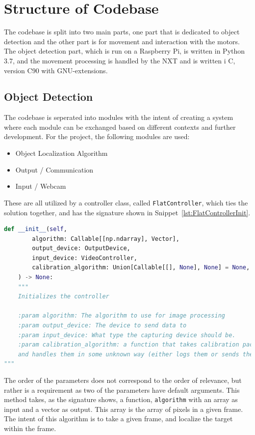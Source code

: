 \section{Structure of Codebase}
The codebase is split into two main parts, one part that is dedicated to object detection and the other part is for movement and interaction with the motors.
The object detection part, which is run on a Raspberry Pi, is written in Python 3{.}7, and the movement processing is handled by the NXT and is written i C, version C90 with GNU-extensions.


\subsection{Object Detection}
The codebase is seperated into modules with the intent of creating a system where each module can be exchanged based on different contexts and further development.
For the project, the following modules are used:
\begin{itemize}
	\item Object Localization Algorithm
	\item Output / Communication
	\item Input / Webcam
\end{itemize}

These are all utilized by a controller class, called \texttt{FlatController}, which ties the solution together, and has the signature shown in Snippet~\ref{lst:FlatControllerInit}.
\begin{lstlisting}[language=Python,label={lst:FlatControllerInit},caption={Initialization method of the \texttt{FlatController} class}]
def __init__(self,
		algorithm: Callable[[np.ndarray], Vector],
		output_device: OutputDevice,
		input_device: VideoController,
		calibration_algorithm: Union[Callable[[], None], None] = None,
	) -> None:
	"""
	Initializes the controller
	
	:param algorithm: The algorithm to use for image processing
	:param output_device: The device to send data to
	:param input_device: What type the capturing device should be.
	:param calibration_algorithm: a function that takes calibration packages,
	and handles them in some unknown way (either logs them or sends them back)
"""

\end{lstlisting}

The order of the parameters does not correspond to the order of relevance, but rather is a requirement as two of the parameters have default arguments.
This method takes, as the signature shows, a function, \texttt{algorithm} with an array as input and a vector as output.
This array is the array of pixels in a given frame.
The intent of this algorithm is to take a given frame, and localize the target within the frame.


